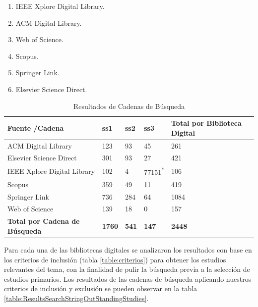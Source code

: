 \documentclass{report}
\begin{document}
            \begin{enumerate}\label{jerarquiaBD}
                \item IEEE Xplore Digital Library.
                \item ACM Digital Library.
                \item Web of Science.
                \item Scopus.
                \item Springer Link.
                \item Elsevier Science Direct.
            \end{enumerate}
            \begin{table}
                \begin{center}
                    \caption{Resultados de Cadenas de Búsqueda}
                    \label{table:ResultsSearchString}
                    \begin{tabular}{| p{6cm} | p{1cm} | p{1cm} | p{1cm} | p{4cm} |}
                        \toprule
                        \hline
                        \textbf{Fuente /Cadena} & \textbf{ss1} & \textbf{ss2} & \textbf{ss3} & \textbf{Total por Biblioteca Digital}\\ \hline
                        ACM Digital Library & 123 & 93 & 45 & 261\\ \hline
                        Elsevier Science Direct & 301 & 93 & 27 & 421\\ \hline
                        IEEE Xplore Digital Library & 102 & 4 & 77151\textsuperscript{*} & 106\\ \hline
                        Scopus & 359 & 49 & 11 & 419\\ \hline
                        Springer Link & 736 & 284 & 64 &  1084\\ \hline
                        Web of Science & 139 & 18 & 0 & 157\\ \hline
                        \textbf{Total por Cadena de Búsqueda} & \textbf{1760} & \textbf{541} & \textbf{147} & \textbf{2448}\\ \hline
                    \end{tabular}
                \end{center}
            \end{table}
            Para cada una de las bibliotecas digitales se analizaron los resultados con base en los criterios de inclusión (tabla \ref{table:criterios}) para obtener los estudios relevantes del tema, con la finalidad de pulir la búsqueda previa a la selección de estudios primarios. Los resultados de las cadenas de búsqueda aplicando nuestros criterios de inclusión y exclusión se pueden observar en la tabla \ref{table:ResultsSearchStringOutStandingStudies}.
\end{document}
